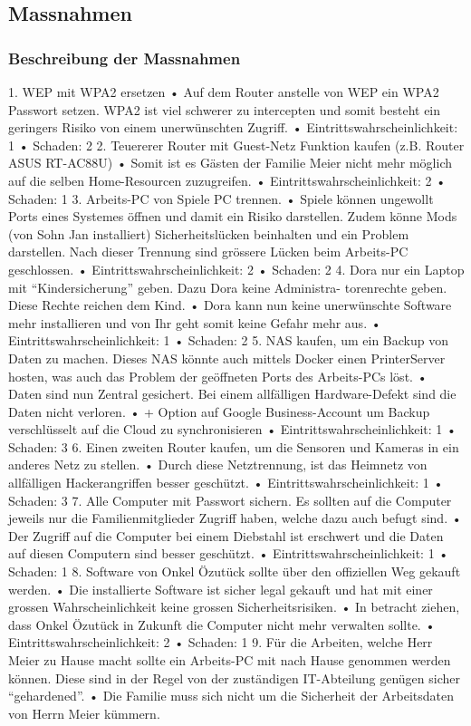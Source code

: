 \documentclass{article}
\begin{document}
\subsection{Massnahmen}

\subsubsection{Beschreibung der Massnahmen}

1. WEP mit WPA2 ersetzen
• Auf dem Router anstelle von WEP ein WPA2 Passwort setzen. WPA2 ist
viel schwerer zu intercepten und somit besteht ein geringers Risiko von einem
unerwünschten Zugriff.
• Eintrittswahrscheinlichkeit: 1
• Schaden: 2
2. Teuererer Router mit Guest-Netz Funktion kaufen (z.B. Router ASUS RT-AC88U)
• Somit ist es Gästen der Familie Meier nicht mehr möglich auf die selben
Home-Resourcen zuzugreifen.
• Eintrittswahrscheinlichkeit: 2
• Schaden: 1
3. Arbeits-PC von Spiele PC trennen.
• Spiele können ungewollt Ports eines Systemes öffnen und damit ein Risiko
darstellen. Zudem könne Mods (von Sohn Jan installiert) Sicherheitslücken
beinhalten und ein Problem darstellen. Nach dieser Trennung sind grössere
Lücken beim Arbeits-PC geschlossen.
• Eintrittswahrscheinlichkeit: 2
• Schaden: 2
4. Dora nur ein Laptop mit “Kindersicherung” geben. Dazu Dora keine Administra-
torenrechte geben. Diese Rechte reichen dem Kind.
• Dora kann nun keine unerwünschte Software mehr installieren und von Ihr
geht somit keine Gefahr mehr aus.
• Eintrittswahrscheinlichkeit: 1
• Schaden: 2
5. NAS kaufen, um ein Backup von Daten zu machen. Dieses NAS könnte auch
mittels Docker einen PrinterServer hosten, was auch das Problem der geöffneten
Ports des Arbeits-PCs löst.
• Daten sind nun Zentral gesichert. Bei einem allfälligen Hardware-Defekt sind
die Daten nicht verloren.
• + Option auf Google Business-Account um Backup verschlüsselt auf die Cloud
zu synchronisieren
• Eintrittswahrscheinlichkeit: 1
• Schaden: 3
6. Einen zweiten Router kaufen, um die Sensoren und Kameras in ein anderes Netz
zu stellen.
• Durch diese Netztrennung, ist das Heimnetz von allfälligen Hackerangriffen
besser geschützt.
• Eintrittswahrscheinlichkeit: 1
• Schaden: 3
7. Alle Computer mit Passwort sichern. Es sollten auf die Computer jeweils nur die
Familienmitglieder Zugriff haben, welche dazu auch befugt sind.
• Der Zugriff auf die Computer bei einem Diebstahl ist erschwert und die Daten
auf diesen Computern sind besser geschützt.
• Eintrittswahrscheinlichkeit: 1
• Schaden: 1
8. Software von Onkel Özutück sollte über den offiziellen Weg gekauft werden.
• Die installierte Software ist sicher legal gekauft und hat mit einer grossen
Wahrscheinlichkeit keine grossen Sicherheitsrisiken.
• In betracht ziehen, dass Onkel Özutück in Zukunft die Computer nicht mehr
verwalten sollte.
• Eintrittswahrscheinlichkeit: 2
• Schaden: 1
9. Für die Arbeiten, welche Herr Meier zu Hause macht sollte ein Arbeits-PC mit
nach Hause genommen werden können. Diese sind in der Regel von der zuständigen
IT-Abteilung genügen sicher “gehardened”.
• Die Familie muss sich nicht um die Sicherheit der Arbeitsdaten von Herrn
Meier kümmern.
\end{document}
